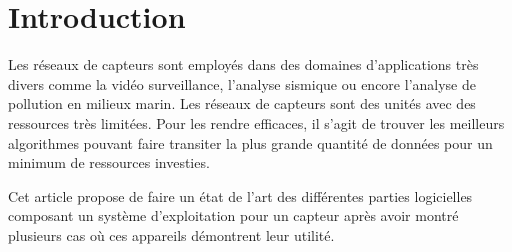 \section{Introduction}

Les réseaux de capteurs sont employés dans des domaines d'applications très
divers \cite{survey} comme la vidéo surveillance, l'analyse sismique ou encore
l'analyse de pollution en milieux marin.  Les réseaux de capteurs sont des
unités avec des ressources très limitées. Pour les rendre efficaces, il
s'agit de trouver les meilleurs algorithmes pouvant faire transiter la plus
grande quantité de données pour un minimum de ressources investies.

Cet article propose de faire un état de l'art des différentes parties
logicielles composant un système d'exploitation pour un capteur après avoir
montré plusieurs cas où ces appareils démontrent leur utilité.
